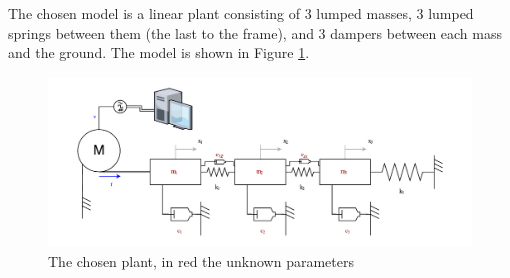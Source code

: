 \documentclass[twosided,a4paper]{article}           %
\begin{document}
The chosen model is a linear plant consisting of 3 lumped masses, 3 lumped springs between them (the last to the frame), and 3 dampers between each mass and the ground. The model is shown in Figure \ref{fig:theplant1}.
\begin{figure}[H]
	\centering
	\includegraphics[width=\linewidth]{img/theplant1}
	\caption[The linear plant]{The chosen plant, in red the unknown parameters}
	\label{fig:theplant1}
\end{figure} 
\end{document}
